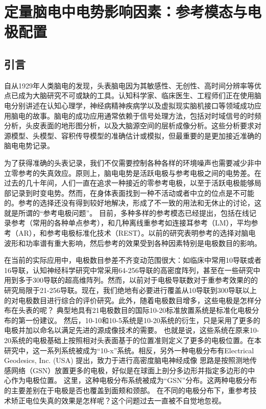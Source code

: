 \chapter{定量脑电中电势影响因素：参考模态与电极配置}
\section{引言}
自从1929年人类脑电的发现，头表脑电因为其敏感性、无创性、高时间分辨率等优点已成为大脑研究不可或缺的工具。认知科学家、临床医生、工程师们正在使用脑电分别讲述在认知心理学，神经病精神疾病学以及虚拟现实脑机接口等领域成功应用脑电的故事。脑电的成功应用通常依赖于信号处理方法，包括对时域信号的时频分析\cite{konig2001topographic}，头皮表面的地形图分析\cite{lehmann1971multichannel}，以及大脑源空间的层析成像分析\cite{pascual1999review}。这些分析要求对源模型\cite{scherg1990fundamentals}、头模型、容积传导模型的准确估计或模拟，但最重要的是更加接近准确的脑电电势记录。

为了获得准确的头表记录，我们不仅需要控制各种各样的环境噪声也需要减少非中立零参考的失真效应。原则上，脑电电势是活跃电极与参考电极之间的电势差\cite{nunez1997eeg}。在过去的几十年间，人们一直在追求一种接近的零参考电极，以至于活跃电极能够局部记录到时变电势。然而，在身体表面找到一种不活动或者中立的位点是不可能的。参考的选择还没有得到较好地解决，形成了不一致的用法和无休止的讨论，这就是所谓的“参考电极问题”。 目前，多种多样的参考模态已经提出，包括在线记录参考（常用的各种单点参考），和几种离线重参考如连接耳参考（LM）\cite{garneski1958equalizing}，平均参考（AR）\cite{offner1950eeg}，和参考电极标准化技术（REST）\cite{yao2001method}。以前的研究表明参考的选择对脑电波形和功率谱\cite{rellecke2013emotion,chella2017non}有重大影响，然后参考的效果受到各种因素特别是电极数目的影响\cite{liu2015estimating,chella2016impact,lei2017understanding}。

在当前的实际应用中，电极数目参差不齐变动范围很大：如临床中常用10导联或者16导联，认知神经科学研究中常采用64-256导联的高密度阵列，甚至在一些研究中用到多于300导联的超高维阵列\cite{jurcak200710,oostenveld2001five}。然而，以前对于电极导联数对于重参考效果的的研究局限于21-256导联。现在，我们绝地有必要进行覆盖从10导联到300导联以上的对电极数目进行综合的评价研究。此外，随着电极数目增多，这些电极是怎样分布在头表的呢？ 典型地具有21电极数目的国际10-20标准放置系统是标准化电极分布的第一份建议\cite{676199734}。 然后，10-10和10-5系统是10-20系统的衍生，只是采用了更多的电极并加以命名以满足先进的源成像技术的需要\cite{10016997968, chatrian1985ten}。 也就是说，这些系统在原来10-20系统的电极基础上按照相对头表面基于的位置准则定义了更多的电极位置。在本研究中，这一系列系统被成为“10-x”系统。相反，另外一种电极分布有Electrical Geodesics, Inc. (USA) 提出，致力于进行高密度脑电神经成像\cite{676199764} 思路是按照测地传感网络（GSN）放置更多的电极，好似是在球面上剖分多边形并指定多边形的中心作为电极位置\cite{tucker1993spatial}。 这里，这种电极分布系统被成为“GSN”分布。这两种电极分布的主要差别在于电极是否也覆盖到面颊和颈部。 在不同的电极分布下，重参考技术矫正电位失真的效果是怎样呢？这个问题过去一直被不自觉地忽视。

